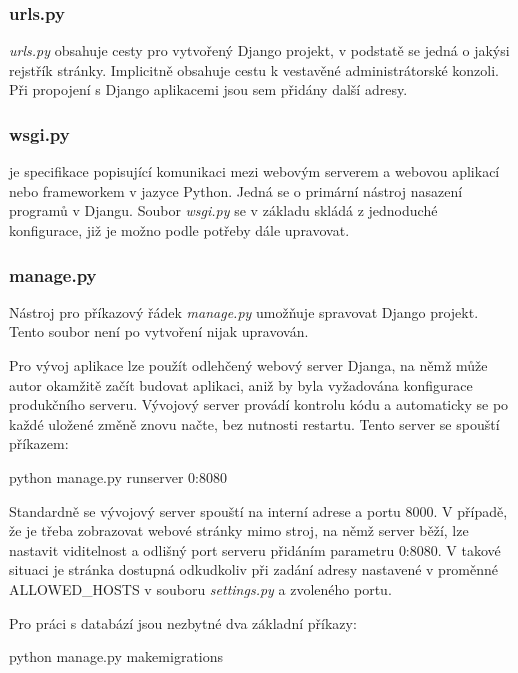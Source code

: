 \subsubsection{urls.py}
\textit{urls.py} obsahuje  cesty pro vytvořený Django projekt, v podstatě se jedná o jakýsi rejstřík stránky. Implicitně obsahuje cestu k vestavěné administrátorské konzoli. Při propojení s Django aplikacemi jsou sem přidány další  adresy.

\subsubsection{wsgi.py}
 je specifikace popisující komunikaci mezi webovým serverem a webovou aplikací nebo frameworkem v jazyce Python. Jedná se o primární nástroj nasazení programů v Djangu. Soubor \textit{wsgi.py} se v základu skládá z jednoduché  konfigurace, již je možno podle potřeby dále upravovat.

\subsubsection{manage.py}
Nástroj pro příkazový řádek \textit{manage.py} umožňuje spravovat Django projekt. Tento soubor není po vytvoření nijak upravován.

Pro vývoj aplikace lze použít odlehčený webový server Djanga, na němž může autor okamžitě začít budovat aplikaci, aniž by byla vyžadována konfigurace produkčního serveru. Vývojový server provádí kontrolu kódu a automaticky se po každé uložené změně znovu načte, bez nutnosti restartu. Tento server se spouští příkazem:

\begin{center}
\textsf{python manage.py runserver 0:8080}
\end{center}

Standardně se vývojový server spouští na interní  adrese a portu 8000. V případě, že je třeba zobrazovat webové stránky mimo stroj, na němž server běží, lze nastavit viditelnost a odlišný port serveru přidáním parametru \textsf{0:8080}. V takové situaci je stránka dostupná odkudkoliv při zadání adresy nastavené v proměnné \textsf{ALLOWED\_HOSTS} v souboru \textit{settings.py} a zvoleného portu.

Pro práci s databází jsou nezbytné dva základní příkazy:

\begin{center}
\textsf{python manage.py makemigrations}
\end{center}

